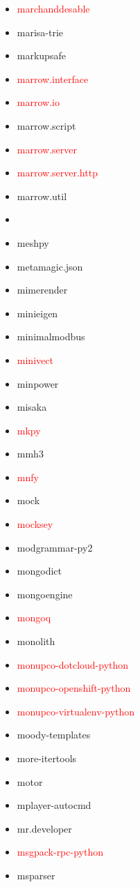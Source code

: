 \documentclass{l4proj}
\begin{document}
\begin{appendices}
{\begin{itemize}
\item\textcolor{red}{marchanddesable}
\item marisa-trie
\item markupsafe
\item\textcolor{red}{marrow.interface}
\item\textcolor{red}{marrow.io}
\item marrow.script
\item\textcolor{red}{marrow.server}
\item\textcolor{red}{marrow.server.http}
\item marrow.util
\item {}
\item meshpy
\item metamagic.json
\item mimerender
\item minieigen
\item minimalmodbus
\item\textcolor{red}{minivect}
\item minpower
\item misaka
\item\textcolor{red}{mkpy}
\item mmh3
\item\textcolor{red}{mnfy}
\item mock
\item\textcolor{red}{mocksey}
\item modgrammar-py2
\item mongodict
\item mongoengine
\item\textcolor{red}{mongoq}
\item monolith
\item\textcolor{red}{monupco-dotcloud-python}
\item\textcolor{red}{monupco-openshift-python}
\end{itemize}
}%
\noindent\parbox[t]{0.32\textwidth}{\raggedright%
\begin{itemize}
\item\textcolor{red}{monupco-virtualenv-python}
\item moody-templates
\item more-itertools
\item motor
\item mplayer-autocmd
\item mr.developer
\item\textcolor{red}{msgpack-rpc-python}
\item msparser

\end{itemize}}
\end{appendices}
\end{document}
